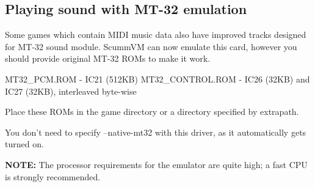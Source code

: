 

\subsection{Playing sound with MT-32 emulation}

Some games which contain MIDI music data also have improved tracks designed
for MT-32 sound module. ScummVM can now emulate this card, however you should
provide original MT-32 ROMs to make it work.

MT32\_PCM.ROM     - IC21 (512KB)
MT32\_CONTROL.ROM - IC26 (32KB) and IC27 (32KB), interleaved byte-wise

Place these ROMs in the game directory or a directory specified by extrapath.

You don't need to specify --native-mt32 with this driver, as it automatically
gets turned on.

\textbf{NOTE:} The processor requirements for the emulator are quite high; a fast CPU is
 strongly recommended.
